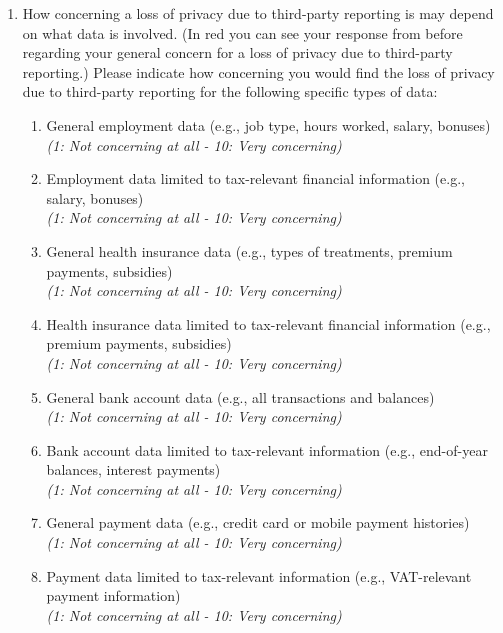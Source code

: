 \documentclass[11pt]{article}
\begin{document}
\begin{enumerate}[resume]
    \item How concerning a loss of privacy due to third-party reporting is may depend on what data is involved. (In red you can see your response from before regarding your general concern for a loss of privacy due to third-party reporting.) Please indicate how concerning you would find the loss of privacy due to third-party reporting for the following specific types of data:

\begin{enumerate}[label=\alph*)]
        \item General employment data (e.g., job type, hours worked, salary, bonuses)\\
        \textit{(1: Not concerning at all - 10: Very concerning)}
        \item Employment data limited to tax-relevant financial information (e.g., salary, bonuses)\\
        \textit{(1: Not concerning at all - 10: Very concerning)}
        \item General health insurance data (e.g., types of treatments, premium payments, subsidies)\\
        \textit{(1: Not concerning at all - 10: Very concerning)}
        \item Health insurance data limited to tax-relevant financial information (e.g., premium payments, subsidies)\\
        \textit{(1: Not concerning at all - 10: Very concerning)}
        \item General bank account data (e.g., all transactions and balances)\\
        \textit{(1: Not concerning at all - 10: Very concerning)}
        \item Bank account data limited to tax-relevant information (e.g., end-of-year balances, interest payments)\\
        \textit{(1: Not concerning at all - 10: Very concerning)}
        \item General payment data (e.g., credit card or mobile payment histories)\\
        \textit{(1: Not concerning at all - 10: Very concerning)}
        \item Payment data limited to tax-relevant information (e.g., VAT-relevant payment information)\\
        \textit{(1: Not concerning at all - 10: Very concerning)}
\end{enumerate}
\end{enumerate}
\end{document}
